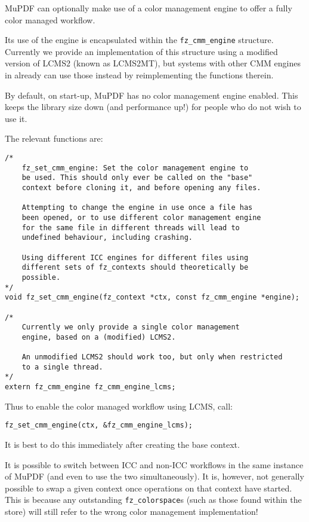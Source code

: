 \documentclass[oneside]{book}
\begin{document}
MuPDF can optionally make use of a color management engine to offer a fully color managed workflow.

Its use of the engine is encapsulated within the \texttt{fz\_cmm\_engine} structure. Currently we provide an implementation of this structure using a modified version of LCMS2 (known as LCMS2MT), but systems with other CMM engines in already can use those instead by reimplementing the functions therein.

By default, on start-up, MuPDF has no color management engine enabled. This keeps the library size down (and performance up!) for people who do not wish to use it.

The relevant functions are:

\begin{lstlisting}
/*
	fz_set_cmm_engine: Set the color management engine to
	be used. This should only ever be called on the "base"
	context before cloning it, and before opening any files.

	Attempting to change the engine in use once a file has
	been opened, or to use different color management engine
	for the same file in different threads will lead to
	undefined behaviour, including crashing.

	Using different ICC engines for different files using
	different sets of fz_contexts should theoretically be
	possible.
*/
void fz_set_cmm_engine(fz_context *ctx, const fz_cmm_engine *engine);

/*
	Currently we only provide a single color management
	engine, based on a (modified) LCMS2.

	An unmodified LCMS2 should work too, but only when restricted
	to a single thread.
*/
extern fz_cmm_engine fz_cmm_engine_lcms;
\end{lstlisting}

Thus to enable the color managed workflow using LCMS, call:

\begin{lstlisting}
fz_set_cmm_engine(ctx, &fz_cmm_engine_lcms);
\end{lstlisting}

It is best to do this immediately after creating the base context.

It is possible to switch between ICC and non-ICC workflows in the same instance of MuPDF (and even to use the two simultaneously). It is, however, not generally possible to swap a given context once operations on that context have started. This is because any outstanding \texttt{fz\_colorspace}s (such as those found within the store) will still refer to the wrong color management implementation!
\end{document}
